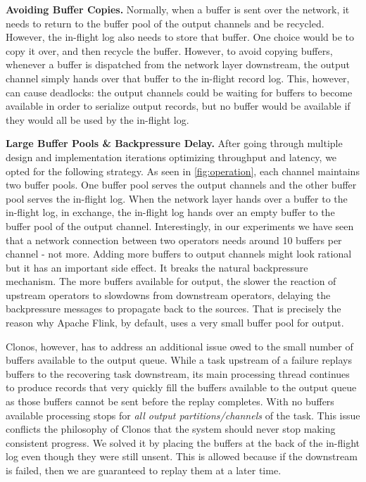 \documentclass[sigconf]{acmart}
\newcommand{\para}[1]{\vspace{1mm}\noindent\textbf{#1.}}
\begin{document}
\para{Avoiding Buffer Copies} Normally, when a buffer is sent over the network, it needs to return to the buffer pool of the output channels and be recycled. However, the in-flight log also needs to store that buffer. One choice would be to copy it over, and then recycle the buffer. However, to avoid copying buffers, whenever a buffer is dispatched from the network layer downstream, the output channel simply hands over that buffer to the in-flight record log.
This, however, can cause deadlocks: the output channels could be waiting for buffers to become available in order to serialize output records, but no buffer would be available if they would all be used by the in-flight log.

\para{Large Buffer Pools \& Backpressure Delay} After going through multiple design and implementation iterations optimizing throughput and latency, we opted for the following strategy. As seen in \autoref{fig:operation}, each channel maintains two buffer pools. One buffer pool serves the output channels and the other buffer pool serves the in-flight log. When the network layer hands over a buffer to the in-flight log, in exchange, the in-flight log hands over an empty buffer to the buffer pool of the output channel. Interestingly, in our experiments we have seen that a network  connection between two operators needs around 10 buffers per channel - not more. Adding more buffers to output channels might look rational but it has an important side effect. It breaks the natural backpressure mechanism. The more buffers available for output, the slower the reaction of upstream operators to slowdowns from downstream operators, delaying the backpressure messages to propagate back to the sources. That is precisely the reason why Apache Flink, by default, uses a very small buffer pool for output. 

Clonos, however, has to address an additional issue owed to the small number of buffers available to the output queue.
While a task upstream of a failure replays buffers to the recovering task downstream, its main processing thread continues to produce records that very quickly fill the buffers available to the output queue as those buffers cannot be sent before the replay completes.
With no buffers available processing stops for \textit{all output partitions/channels} of the task. This issue conflicts the philosophy of Clonos that the system should never stop making consistent progress.
We solved it by placing the buffers at the back of the in-flight log even though they were still unsent. This is allowed because if the downstream is failed, then we are guaranteed to replay them at a later time.
\end{document}
